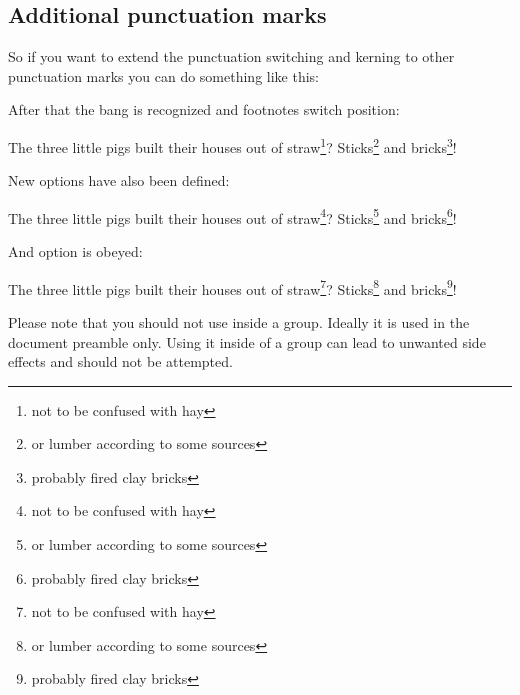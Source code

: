 \documentclass{fnpct-manual}
\begin{document}
\subsection{Additional punctuation marks}
So if you want to extend the punctuation switching and kerning to other punctuation
marks you can do something like this:
\begin{sourcecode}
\end{sourcecode}
After that the bang is recognized and footnotes switch position:
\begin{example}
  The three little pigs built their houses out of straw\footnote{not to be
    confused with hay}? Sticks\footnote{or lumber according to some sources}
  and bricks\footnote{probably fired clay bricks}!
\end{example}

New options have also been defined:
\begin{example}
  The three little pigs built their houses out of straw\footnote{not to be
    confused with hay}? Sticks\footnote{or lumber according to some sources}
  and bricks\footnote{probably fired clay bricks}!
\end{example}

And option  is obeyed:
\begin{example}
  The three little pigs built their houses out of straw\footnote{not to be
    confused with hay}? Sticks\footnote{or lumber according to some sources}
  and bricks\footnote{probably fired clay bricks}!
\end{example}

\begin{bewareofthedog}
  Please note that you should not use  inside a
  group. Ideally it is used in the document preamble only.  Using it inside of
  a group can lead to unwanted side effects and should not be attempted.
\end{bewareofthedog}

\end{document}
